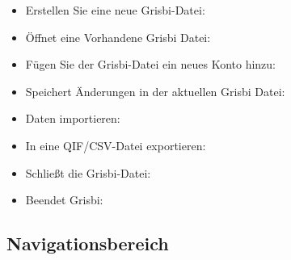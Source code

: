 \begin{itemize}
	\item Erstellen Sie eine neue Grisbi-Datei: 
	\item Öffnet eine Vorhandene Grisbi Datei: 
	\item Fügen Sie der Grisbi-Datei ein neues Konto hinzu: 
	\item Speichert Änderungen in der aktuellen	Grisbi Datei: 
	\item Daten importieren: 
	\item In eine \gls{QIF}/\gls{CSV}-Datei exportieren: 
	\item Schließt die Grisbi-Datei: 
	\item Beendet Grisbi: 
\end{itemize}


\subsection{Navigationsbereich}

